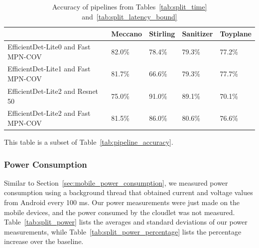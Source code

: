 \begin{table}
\begin{tabular}{|l||l|l|l|l|}
  \hline
  & Meccano & Stirling & Sanitizer & Toyplane\\
  \hline
  \hline
  EfficientDet-Lite0 and Fast MPN-COV & 82.0\% & 78.4\% & 79.3\% & 77.2\%\\
  EfficientDet-Lite1 and Fast MPN-COV & 81.7\% & 66.6\% & 79.3\% & 77.7\%\\
  EfficientDet-Lite2 and Resnet 50 & 75.0\% & 91.0\% & 89.1\% & 70.1\%\\
  EfficientDet-Lite2 and Fast MPN-COV & 81.5\% & 86.0\% & 80.6\% & 76.6\%\\
  \hline
\end{tabular}
  \begin{captiontext}
    This table is a subset of Table~\ref{tab:pipeline_accuracy}.
  \end{captiontext}
  \caption{
    Accuracy of pipelines from Tables~\ref{tab:split_time}
    and~\ref{tab:split_latency_bound}
  }\label{tab:split_pipeline_accuracy}
\end{table}

\subsubsection{Power Consumption}

Similar to Section~\ref{sec:mobile_power_consumption}, we measured power
consumption using a background thread that obtained current and voltage values
from Android every 100 ms.
Our power measurements were just made on the mobile devices, and the power
consumed by the cloudlet was not measured.
Table~\ref{tab:split_power} lists the averages and standard deviations of our
power measurements, while Table~\ref{tab:split_power_percentage} lists the
percentage increase over the baseline.

